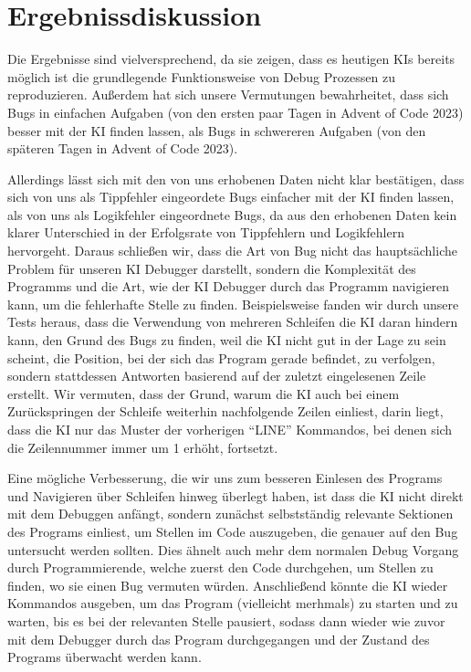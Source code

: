 \documentclass[a4paper,12pt,ngerman]{scrartcl}
\begin{document}
\section{Ergebnissdiskussion}

Die Ergebnisse sind vielversprechend, da sie zeigen, dass es heutigen KIs bereits möglich ist die grundlegende Funktionsweise von Debug Prozessen zu reproduzieren. Außerdem hat sich unsere Vermutungen bewahrheitet, dass sich Bugs in einfachen Aufgaben (von den ersten paar Tagen in Advent of Code 2023) besser mit der KI finden lassen, als Bugs in schwereren Aufgaben (von den späteren Tagen in Advent of Code 2023).

Allerdings lässt sich mit den von uns erhobenen Daten nicht klar bestätigen, dass sich von uns als Tippfehler eingeordete Bugs einfacher mit der KI finden lassen, als von uns als Logikfehler eingeordnete Bugs, da aus den erhobenen Daten kein klarer Unterschied in der Erfolgsrate von Tippfehlern und Logikfehlern hervorgeht. Daraus schließen wir, dass die Art von Bug nicht das hauptsächliche Problem für unseren KI Debugger darstellt, sondern die Komplexität des Programms und die Art, wie der KI Debugger durch das Programm navigieren kann, um die fehlerhafte Stelle zu finden. Beispielsweise fanden wir durch unsere Tests heraus, dass die Verwendung von mehreren Schleifen die KI daran hindern kann, den Grund des Bugs zu finden, weil die KI nicht gut in der Lage zu sein scheint, die Position, bei der sich das Program gerade befindet, zu verfolgen, sondern stattdessen Antworten basierend auf der zuletzt eingelesenen Zeile erstellt. Wir vermuten, dass der Grund, warum die KI auch bei einem Zurückspringen der Schleife weiterhin nachfolgende Zeilen einliest, darin liegt, dass die KI nur das Muster der vorherigen ``LINE'' Kommandos, bei denen sich die Zeilennummer immer um 1 erhöht, fortsetzt.

Eine mögliche Verbesserung, die wir uns zum besseren Einlesen des Programs und Navigieren über Schleifen hinweg überlegt haben, ist dass die KI nicht direkt mit dem Debuggen anfängt, sondern zunächst selbstständig relevante Sektionen des Programs einliest, um Stellen im Code auszugeben, die genauer auf den Bug untersucht werden sollten. Dies ähnelt auch mehr dem normalen Debug Vorgang durch Programmierende, welche zuerst den Code durchgehen, um Stellen zu finden, wo sie einen Bug vermuten würden. Anschließend könnte die KI wieder Kommandos ausgeben, um das Program (vielleicht merhmals) zu starten und zu warten, bis es bei der relevanten Stelle pausiert, sodass dann wieder wie zuvor mit dem Debugger durch das Program durchgegangen und der Zustand des Programs überwacht werden kann.
\end{document}
